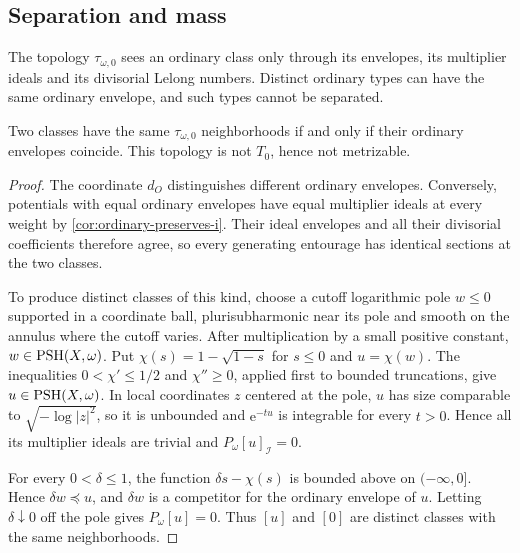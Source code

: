 \subsection{Separation and mass}

The topology $\tau_{\omega,0}$ sees an ordinary class only through its envelopes, its multiplier ideals and its divisorial Lelong numbers. Distinct ordinary types can have the same ordinary envelope, and such types cannot be separated.

\begin{proposition}\label{prop:ordinary-topology-nonseparation}
Two classes have the same $\tau_{\omega,0}$ neighborhoods if and only if their ordinary envelopes coincide. This topology is not $T_0$, hence not metrizable.
\end{proposition}
\begin{proof}
The coordinate $d_O$ distinguishes different ordinary envelopes. Conversely, potentials with equal ordinary envelopes have equal multiplier ideals at every weight by \cref{cor:ordinary-preserves-i}. Their ideal envelopes and all their divisorial coefficients therefore agree, so every generating entourage has identical sections at the two classes.

To produce distinct classes of this kind, choose a cutoff logarithmic pole $w\leq0$ supported in a coordinate ball, plurisubharmonic near its pole and smooth on the annulus where the cutoff varies. After multiplication by a small positive constant, $w\in\mathrm{PSH}(X,\omega)$. Put $\chi(s)=1-\sqrt{1-s}$ for $s\leq0$ and $u=\chi(w)$. The inequalities $0<\chi'\leq1/2$ and $\chi''\geq0$, applied first to bounded truncations, give $u\in\mathrm{PSH}(X,\omega)$. In local coordinates $z$ centered at the pole, $u$ has size comparable to $\sqrt{-\log|z|^2}$, so it is unbounded and $\mathrm e^{-tu}$ is integrable for every $t>0$. Hence all its multiplier ideals are trivial and $P_\omega[u]_{\mathcal I}=0$.

For every $0<\delta\leq1$, the function $\delta s-\chi(s)$ is bounded above on $(-\infty,0]$. Hence $\delta w\preceq u$, and $\delta w$ is a competitor for the ordinary envelope of $u$. Letting $\delta\downarrow0$ off the pole gives $P_\omega[u]=0$. Thus $[u]$ and $[0]$ are distinct classes with the same neighborhoods.
\end{proof}

